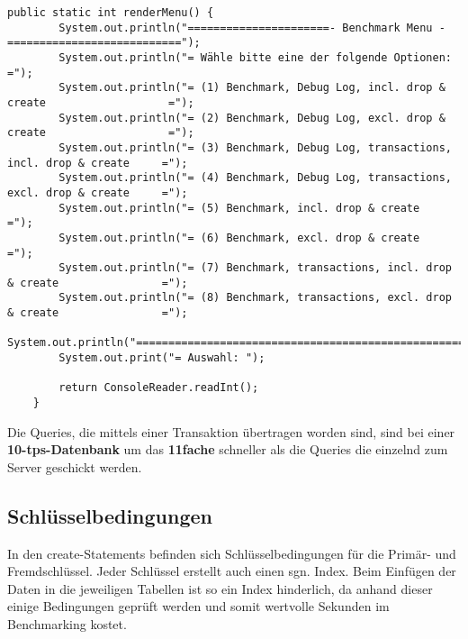 \begin{lstlisting}[caption={Renderer für das Konsolen Menü}]
	public static int renderMenu() {
		System.out.println("======================- Benchmark Menu -===========================");
		System.out.println("= Wähle bitte eine der folgende Optionen:                         =");
		System.out.println("= (1) Benchmark, Debug Log, incl. drop & create                   =");
		System.out.println("= (2) Benchmark, Debug Log, excl. drop & create                   =");
		System.out.println("= (3) Benchmark, Debug Log, transactions, incl. drop & create     =");
		System.out.println("= (4) Benchmark, Debug Log, transactions, excl. drop & create     =");
		System.out.println("= (5) Benchmark, incl. drop & create                              =");
		System.out.println("= (6) Benchmark, excl. drop & create                              =");
		System.out.println("= (7) Benchmark, transactions, incl. drop & create                =");
		System.out.println("= (8) Benchmark, transactions, excl. drop & create                =");
		System.out.println("===================================================================");
		System.out.print("= Auswahl: ");
		
		return ConsoleReader.readInt();
	}
\end{lstlisting}

 
Die Queries, die mittels einer Transaktion übertragen worden sind, sind bei
einer \textbf{10-tps-Datenbank} um \ca das \textbf{11fache} schneller als die
Queries die einzelnd zum Server geschickt werden. 

\subsection{Schlüsselbedingungen}
In den create-Statements befinden sich Schlüsselbedingungen für die Primär- und
Fremdschlüssel. Jeder Schlüssel erstellt auch einen sgn. Index. Beim Einfügen
der Daten in die jeweiligen Tabellen ist so ein Index hinderlich, da anhand
dieser einige Bedingungen geprüft werden und somit wertvolle Sekunden im
Benchmarking kostet.

